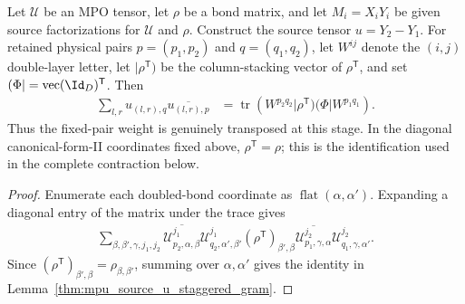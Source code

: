 \begin{lemma}
    \label{thm:mpu_source_u_transpose_fixed_pair_trace}
    \leanok
    Let $\mathcal U$ be an MPO tensor, let $\rho$ be a bond matrix, and let
    $M_i=X_iY_i$ be given source factorizations for $\mathcal U$ and $\rho$.
    Construct the source tensor $u=Y_2\mathbin{-}Y_1$. For retained physical
    pairs $p=(p_1,p_2)$ and $q=(q_1,q_2)$, let $W^{ij}$ denote the $(i,j)$
    double-layer letter, let $\lvert\rho^{\mathsf T})$ be the column-stacking
    vector of $\rho^{\mathsf T}$, and set
    $(\Phi\rvert=\operatorname{vec}(\Id_D)^{\mathsf T}$. Then
    \begin{align}
        \sum_{l,r}u_{(l,r),q}\overline{u_{(l,r),p}}
         & =\operatorname{tr}\!\left(
        W^{p_2q_2}\lvert\rho^{\mathsf T})(\Phi\rvert W^{p_1q_1}
        \right).
    \end{align}
    Thus the fixed-pair weight is genuinely transposed at this stage. In the
    diagonal canonical-form-II coordinates fixed above,
    $\rho^{\mathsf T}=\rho$; this is the identification used in the complete
    contraction below.
\end{lemma}

\begin{proof}\leanok
    Enumerate each doubled-bond coordinate as
    $\operatorname{flat}(\alpha,\alpha')$. Expanding a diagonal entry of the
    matrix under the trace gives
    \begin{align}
        \sum_{\beta,\beta',\gamma,j_1,j_2}
        \overline{\mathcal U^{j_1}_{p_2,\alpha,\beta}}
        \mathcal U^{j_1}_{q_2,\alpha',\beta'}
        (\rho^{\mathsf T})_{\beta',\beta}
        \overline{\mathcal U^{j_2}_{p_1,\gamma,\alpha}}
        \mathcal U^{j_2}_{q_1,\gamma,\alpha'}.
    \end{align}
    Since $(\rho^{\mathsf T})_{\beta',\beta}=\rho_{\beta,\beta'}$,
    summing over $\alpha,\alpha'$ gives the identity in
    Lemma~\ref{thm:mpu_source_u_staggered_gram}.
\end{proof}

